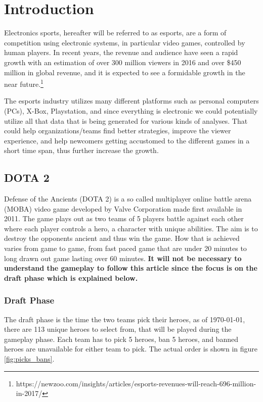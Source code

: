\documentclass[report.tex]{subfiles}
\begin{document}
\section*{\centering Introduction}

Electronics sports, hereafter will be referred to as esports, are a form of competition using electronic systems, in particular video games, controlled by human players. In recent years, the revenue and audience have seen a rapid growth with an estimation of over 300 million viewers in 2016 and over \$450 million in global revenue, and it is expected to see a formidable growth in the near future.\footnote{https://newzoo.com/insights/articles/esports-revenues-will-reach-696-million-in-2017/}

The esports industry utilizes many different platforms such as personal computers (PCs), X-Box, Playstation, and since everything is electronic we could potentially utilize all that data that is being generated for various kinds of analyses. That could help organizations/teams find better strategies, improve the viewer experience, and help newcomers getting accustomed to the different games in a short time span, thus further increase the growth.

\subsection*{DOTA 2}

Defense of the Ancients (DOTA 2) is a so called multiplayer online battle arena (MOBA) video game developed by Valve Corporation made first available in 2011. The game plays out as two teams of 5 players battle against each other where each player controls a hero, a character with unique abilities. The aim is to destroy the opponents ancient and thus win the game. How that is achieved varies from game to game, from fast paced game that are under 20 minutes to long drawn out game lasting over 60 minutes. \textbf{It will not be necessary to understand the gameplay to follow this article since the focus is on the draft phase which is explained below.}

\subsubsection*{Draft Phase}

The draft phase is the time the two teams pick their heroes, as of \today, there are 113 unique heroes to select from, that will be played during the gameplay phase. Each team has to pick 5 heroes, ban 5 heroes, and banned heroes are unavailable for either team to pick. The actual order is shown in figure \ref{fig:picks_bans}.
\end{document}
